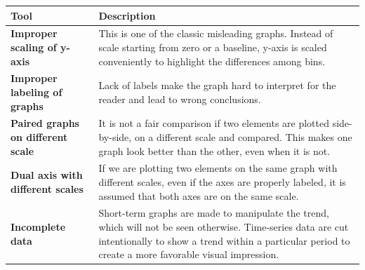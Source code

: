 \documentclass[]{book}
\theoremstyle{definition}
\theoremstyle{definition}
\theoremstyle{definition}
\theoremstyle{remark}
\begin{document}
\begin{longtable}[]{@{}ll@{}}
\toprule
\begin{minipage}[b]{0.16\columnwidth}\raggedright\strut
\textbf{Tool}\strut
\end{minipage} & \begin{minipage}[b]{0.78\columnwidth}\raggedright\strut
\textbf{Description}\strut
\end{minipage}\tabularnewline
\midrule
\endhead
\begin{minipage}[t]{0.16\columnwidth}\raggedright\strut
\textbf{Improper scaling of y-axis}\strut
\end{minipage} & \begin{minipage}[t]{0.78\columnwidth}\raggedright\strut
This is one of the classic misleading graphs. Instead of scale starting
from zero or a baseline, y-axis is scaled conveniently to highlight the
differences among bins.\strut
\end{minipage}\tabularnewline
\begin{minipage}[t]{0.16\columnwidth}\raggedright\strut
\textbf{Improper labeling of graphs}\strut
\end{minipage} & \begin{minipage}[t]{0.78\columnwidth}\raggedright\strut
Lack of labels make the graph hard to interpret for the reader and lead
to wrong conclusions.\strut
\end{minipage}\tabularnewline
\begin{minipage}[t]{0.16\columnwidth}\raggedright\strut
\textbf{Paired graphs on different scale}\strut
\end{minipage} & \begin{minipage}[t]{0.78\columnwidth}\raggedright\strut
It is not a fair comparison if two elements are plotted side-by-side, on
a different scale and compared. This makes one graph look better than
the other, even when it is not.\strut
\end{minipage}\tabularnewline
\begin{minipage}[t]{0.16\columnwidth}\raggedright\strut
\textbf{Dual axis with different scales}\strut
\end{minipage} & \begin{minipage}[t]{0.78\columnwidth}\raggedright\strut
If we are plotting two elements on the same graph with different scales,
even if the axes are properly labeled, it is assumed that both axes are
on the same scale.\strut
\end{minipage}\tabularnewline
\begin{minipage}[t]{0.16\columnwidth}\raggedright\strut
\textbf{Incomplete data}\strut
\end{minipage} & \begin{minipage}[t]{0.78\columnwidth}\raggedright\strut
Short-term graphs are made to manipulate the trend, which will not be
seen otherwise. Time-series data are cut intentionally to show a trend
within a particular period to create a more favorable visual
impression.\strut
\end{minipage}\tabularnewline
\bottomrule
\end{longtable}
\end{document}
